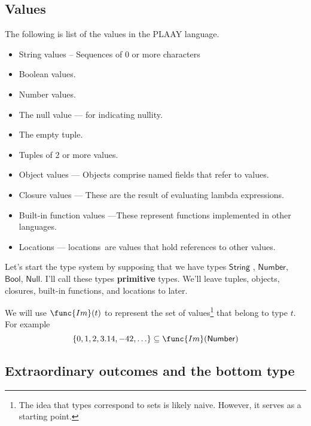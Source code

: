 \documentclass[12pt]{article}
\begin{document}
\subsection{Values}

The following is list of the values in the PLAAY language.

\begin{itemize}
\item String values -- Sequences of 0 or more characters

\item Boolean values.

\item Number values.

\item The null value --- for indicating nullity.

\item The empty tuple.

\item Tuples of 2 or more values.

\item Object values --- Objects comprise named fields that refer to values.

\item Closure values --- These are the result of evaluating lambda
expressions.

\item Built-in function values ---These represent functions implemented in
other languages.

\item Locations --- locations\ are values that hold references to other
values.
\end{itemize}

Let's start the type system by supposing that we have types $\mathsf{String}$%
, $\mathsf{Number}$, $\mathsf{Bool}$, $\mathsf{Null}$. I'll call these types 
\textbf{primitive} types. We'll leave tuples, objects, closures, built-in
functions, and locations to later.

We will use $\func{Im}(t)$ to represent the set of values\footnote{%
The idea that types correspond to sets is likely naive. However, it serves
as a starting point.} that belong to type $t$. For example%
\begin{equation*}
\left\{ 0,1,2,3.14,-42,\ldots \right\} \subseteq \func{Im}(\mathsf{Number})
\end{equation*}

\subsection{Extraordinary outcomes and the bottom type}
\end{document}
